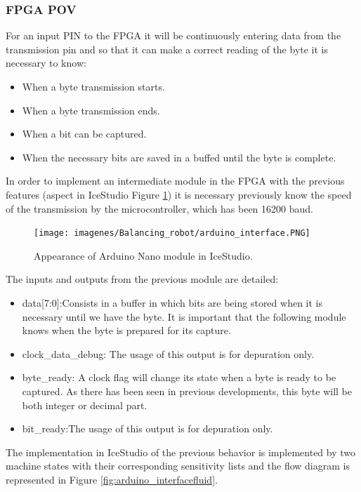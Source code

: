\subsubsection{FPGA POV} \label{sec:vista_fpga}

For an input PIN to the FPGA it will be continuously entering data from the transmission pin and so that it can make a correct reading of the byte it is necessary to know: 

\begin{itemize}
	\item When a byte transmission starts.
	\item When a byte transmission ends.
	\item When a bit can be captured. 
	\item When the necessary bits are saved in a buffed until the byte is complete.
\end{itemize}

In order to implement an intermediate module in the FPGA with the previous features (aspect in IceStudio Figure \ref{fig:arduino_interface}) it is necessary previously know the speed of the transmission by the microcontroller, which has been 16200 baud. \newline


\begin{figure}[H]
	\center	\texttt{[image: imagenes/Balancing\_robot/arduino\_interface.PNG]}
	\caption{Appearance of 	Arduino Nano module in IceStudio.}
	\label{fig:arduino_interface}
\end{figure}

The inputs and outputs from the previous module are detailed:

\begin{itemize}
	\item data[7:0]:Consists in a buffer in which bits are being stored when it is necessary until we have the byte. It is important that the following module knows when the byte is prepared for its capture.
	\item clock\_data\_debug: The usage of this output is for depuration only.
	\item byte\_ready: A clock flag will change its state when a byte is ready to be captured. As there has been seen in previous developments, this byte will be both integer or decimal part.
	\item bit\_ready:The usage of this output is for depuration only.
\end{itemize} 

The implementation in IceStudio of the previous behavior is implemented by two machine states with their corresponding sensitivity lists and the flow diagram is represented in Figure \ref{fig:arduino_interfacefluid}.

